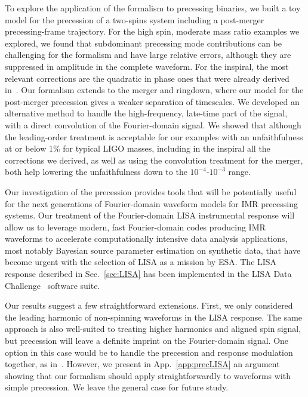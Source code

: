 \documentclass[aps,showpacs,twocolumn,
prd,superscriptaddress,nofootinbib]{revtex4-1}
\newcommand{\jgb}[1]{{\color{DarkGreen} #1}}
\begin{document}
To explore the application of the formalism to precessing binaries, we built a toy model for the precession of a two-spins system including a post-merger precessing-frame trajectory. For the high spin, moderate mass ratio examples we explored, we found that subdominant precessing mode contributions can be challenging for the formalism and have large relative errors, \jgb{although they are suppressed} in amplitude in the complete waveform. For the inspiral, the most relevant corrections are the quadratic in phase ones that were already derived in~\cite{KCY14}. Our formalism extends to the merger and ringdown, where our model for the post-merger precession gives a weaker separation of timescales. We developed an alternative method to handle the high-frequency, late-time part of the signal, with a direct convolution of the Fourier-domain signal. We showed that although the leading-order treatment is acceptable for our examples with an unfaithfulness at or below 1\% for typical LIGO masses, including in the inspiral all the corrections we derived, as well as using the convolution treatment for the merger, both help lowering the unfaithfulness down to the $10^{-4}$-$10^{-3}$ range.

Our investigation of the precession provides tools that will be potentially useful for the next generations of Fourier-domain waveform models for IMR precessing systems. Our treatment of the Fourier-domain LISA instrumental response will allow us to leverage modern, fast Fourier-domain codes producing IMR waveforms to accelerate computationally intensive data analysis applications, most notably Bayesian source parameter estimation on synthetic data, that have become urgent with the selection of LISA as a mission by ESA. The LISA response described in Sec.~\ref{sec:LISA} has been implemented in the LISA Data Challenge~\cite{LDC} software suite.

Our results \jgb{suggest a few} straightforward extensions. First, we only considered the leading harmonic of non-spinning waveforms in the LISA response. \jgb{The same approach is also well-suited to treating higher harmonics and aligned spin signal}, but precession will leave a definite imprint on the Fourier-domain signal. One option in this case would be to handle the precession and response modulation together, as in~\cite{Klein+15}. However, we present in App.~\ref{app:precLISA} an argument showing that our formalism should apply straightforwardly to waveforms with simple precession. We leave the general case for future study.
\end{document}
